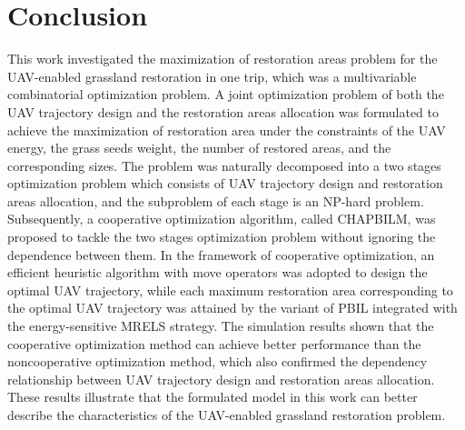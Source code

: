 \documentclass[preprint,5pt]{elsarticle}
\begin{document}
\section{Conclusion} \label{Conclusion}
This work investigated the maximization of restoration areas problem for the UAV-enabled grassland restoration in one trip, which was a multivariable combinatorial optimization problem. A joint optimization problem of both the UAV trajectory design and the restoration areas allocation was formulated to achieve the maximization of restoration area under the constraints of the UAV energy, the grass seeds weight, the number of restored areas, and the corresponding sizes. The problem was naturally decomposed into a two stages optimization problem which consists of UAV trajectory design and restoration areas allocation, and the subproblem of each stage is an NP-hard problem. Subsequently, a cooperative optimization algorithm, called CHAPBILM, was proposed to tackle the two stages optimization problem without ignoring the dependence between them. In the framework of cooperative optimization, an efficient heuristic algorithm with move operators was adopted to design the optimal UAV trajectory, while each maximum restoration area corresponding to the optimal UAV trajectory was attained by the variant of PBIL integrated with the energy-sensitive MRELS strategy. The simulation results shown that the cooperative optimization method can achieve better performance than the noncooperative optimization method, which also confirmed the dependency relationship between UAV trajectory design and restoration areas allocation. These results illustrate that the formulated model in this work can better describe the characteristics of the UAV-enabled grassland restoration problem.
\end{document}
